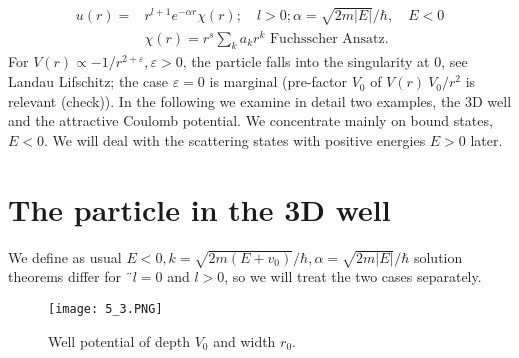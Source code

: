 \begin{equation}
\begin{aligned} u(r)=& r^{l+1} e^{-\alpha r} \chi(r) ; \quad l>0 ; \alpha=\sqrt{2 m|E|} / \hbar, \quad E<0 \\ & \chi(r)=r^{s} \sum_{k} a_{k} r^{k} \text { Fuchsscher Ansatz. } \end{aligned}
\end{equation}
For $V (r)\propto -1 / r^{2 + \varepsilon}, \varepsilon> 0$, the particle falls into the singularity at 0, see Landau Lifschitz; the case $\varepsilon = 0$ is marginal (pre-factor $V_0$ of $V (r) ~ V_0 / r^2$ is relevant (check)). In the following we examine in detail two examples, the 3D well and the attractive Coulomb potential. We concentrate mainly on bound states, $E <0$. We will deal with the scattering states with positive energies $E> 0$ later.

\section{The particle in the 3D well}
We define as usual $E <0, k =\sqrt{2m(E+v_0)}/\hbar, \alpha=\sqrt{2m|E|}/\hbar$ solution theorems differ for ¨$l = 0$ and $l> 0$, so we will treat the two cases separately.
\begin{figure}[ht]
    \begin{minipage}{0.5\textwidth}
        \centering
        \texttt{[image: 5\_3.PNG]}
    \end{minipage}
    \begin{minipage}{0.5\textwidth}
        \caption{Well potential of depth $V_0$ and width $r_0$.}
    \end{minipage}
\end{figure}
